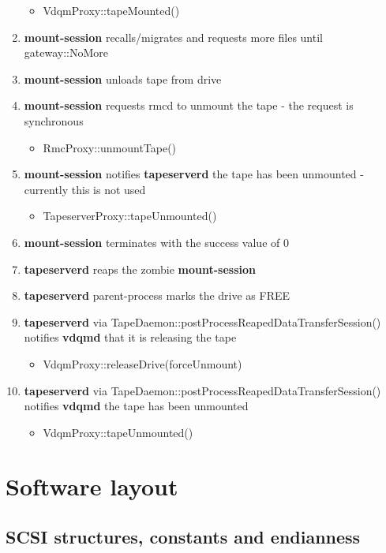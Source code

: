 \begin{enumerate}[noitemsep]
\begin{itemize}
\item        VdqmProxy::tapeMounted()
\end{itemize}
\item \textbf{mount-session} recalls/migrates and requests more files until gateway::NoMore
\item \textbf{mount-session} unloads tape from drive
\item \textbf{mount-session} requests rmcd to unmount the tape - the request is synchronous
\begin{itemize}
\item        RmcProxy::unmountTape()
\end{itemize}
\item \textbf{mount-session} notifies \textbf{tapeserverd} the tape has been unmounted - currently this is not used
\begin{itemize}
\item        TapeserverProxy::tapeUnmounted()
\end{itemize}
\item \textbf{mount-session} terminates with the success value of 0
\item \textbf{tapeserverd} reaps the zombie \textbf{mount-session}
\item \textbf{tapeserverd} parent-process marks the drive as FREE
\item \textbf{tapeserverd} via TapeDaemon::postProcessReapedDataTransferSession() notifies \textbf{vdqmd} that it is releasing the tape
\begin{itemize}
\item        VdqmProxy::releaseDrive(forceUnmount)
\end{itemize}
\item \textbf{tapeserverd} via TapeDaemon::postProcessReapedDataTransferSession() notifies \textbf{vdqmd} the tape has been unmounted
\begin{itemize}
\item        VdqmProxy::tapeUnmounted()
\end{itemize}

\end{enumerate}


\section{Software layout}

\subsection{SCSI structures, constants and endianness}

